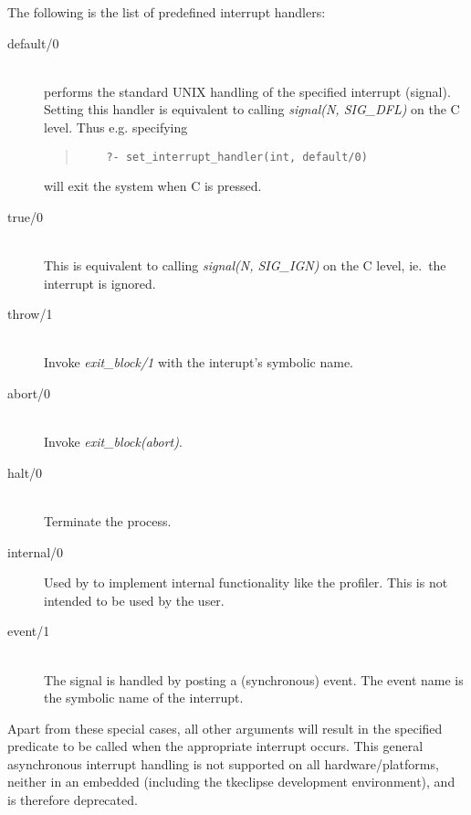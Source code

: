 The following is the list of predefined interrupt handlers:
\begin{description}
\item[default/0]
\ \\
performs the standard UNIX handling of the specified interrupt (signal).
    Setting this handler is equivalent to calling {\it signal(N, SIG_DFL)}
    on the C level.
    Thus e.g. specifying
    \begin{quote}\begin{verbatim}
    ?- set_interrupt_handler(int, default/0)
    \end{verbatim}\end{quote}
    will exit the {\eclipse} system when {\uparr}C is pressed.

\item[true/0]
\ \\
    This is equivalent to calling {\it signal(N, SIG_IGN)} on the C level,
    ie.\ the interrupt is ignored.

\item[throw/1]
\ \\
    Invoke {\it exit_block/1} with the interupt's symbolic name.
\item[abort/0] 
\ \\
    Invoke {\it exit_block(abort)}.
\item[halt/0]
\ \\
    Terminate the {\eclipse} process.
\item[internal/0]
    Used by {\eclipse} to implement internal functionality like the
    profiler. This is not intended to be used by the user.
\item[event/1]
\ \\
    The signal is handled by posting a (synchronous) event. The event
    name is the symbolic name of the interrupt.
\end{description}
Apart from these special cases, all other arguments will
result in the specified predicate to be called when the appropriate
interrupt occurs. This general asynchronous interrupt handling
is not supported on all hardware/platforms,
neither in an embedded {\eclipse} (including the
 tkeclipse development environment),
and is therefore deprecated.


%

